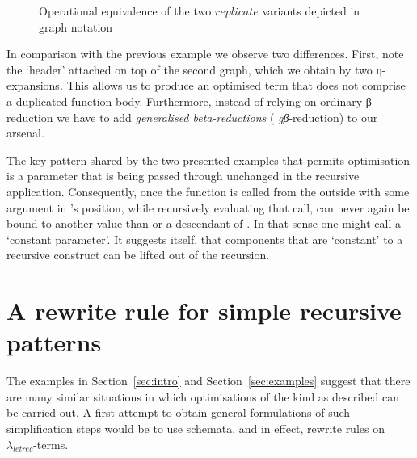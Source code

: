 \documentclass[submission,copyright,creativecommons]{eptcs}
\newcommand{\lambdaletrec}{\ensuremath{\lambda_\textit{letrec}}}
\newcommand\haskell[1]{\ensuremath{\mathit{#1}}}
\newcommand{\nbd}{\nobreakdash}
\renewcommand\;{\,}
\begin{document}
\begin{figure}[htp]
\begin{center}

\end{center}
\caption{\label{replicate_graphs}Operational equivalence of the two \haskell{replicate} variants depicted in graph notation}
\end{figure}

In comparison with the previous example we observe two differences. First, note
the `header'  attached on top of the second graph, which we
obtain by two η-expansions. This allows us to produce an optimised term that does
not comprise a duplicated function body. Furthermore, instead of relying
on ordinary β-reduction we have to add {\it generalised beta-reductions} ({\it
gβ}-reduction) \cite{kama:nede:1995} to our arsenal.



The key pattern shared by the two presented examples that permits optimisation
is a parameter  that is being passed through
unchanged in the recursive application. Consequently, once the function is
called from the outside with some argument  in 's position, while
recursively evaluating that call,  can never again be bound to another value
than  or a descendant of . In that sense one might call  a `constant
parameter'. It suggests itself, that components that are `constant' to a
recursive construct can be lifted out of the recursion.

\section{A rewrite rule for simple recursive patterns}
\label{sec:rules}


The examples in Section~\ref{sec:intro} and Section~\ref{sec:examples} 
suggest that there are many similar situations
in which optimisations of the kind as described can be carried out. 
A first attempt to obtain general formulations of such simplification steps
would be to use schemata, and in effect, rewrite rules on \lambdaletrec\nbd-terms.    
\end{document}
